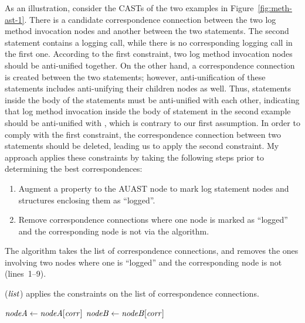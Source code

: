 As an illustration, consider the CASTs of the two examples in Figure~\ref{fig:meth-ast-1}. There is a candidate correspondence connection between the two log method invocation nodes and another between the two  statements. The second  statement contains a logging call, while there is no corresponding logging call in the first one. According to the first constraint, two log method invocation nodes should be anti-unified together. On the other hand, a correspondence connection is created between the two  statements; however, anti-unification of these statements includes anti-unifying their children nodes as well. Thus, statements inside the body of the  statements must be anti-unified with each other, indicating that log method invocation inside the body of  statement in the second example should be anti-unified with \nothing, which is contrary to our first assumption. In order to comply with the first constraint, the correspondence connection between two  statements should be deleted, leading us to apply the second constraint. My approach applies these constraints by taking the following steps prior to determining the best correspondences:
\begin{enumerate} [leftmargin=.4in]
\item	Augment a property to the AUAST node to mark log statement nodes and structures enclosing them as ``logged''.
\item	Remove correspondence connections where one node is marked as ``logged'' and the corresponding node is not via the  algorithm.
\end{enumerate}

The  algorithm takes the list of correspondence connections, and removes the ones involving two nodes where one is ``logged'' and the corresponding node is not (lines~1--9).

\begin{algorithm}
  \caption{($\mathit{list}$) applies the constraints on the list of correspondence connections.}
  \label{computeMatches}
  \begin{algorithmic}[1]
  \ApplyConstraints
      \State $\mathit{nodeA} \gets \mathit{nodeA}[\mathit{corr}]$
	  \State $\mathit{nodeB} \gets \mathit{nodeB}[\mathit{corr}]$
 	  \EndIf 		
 \EndFor 	
	
  \end{algorithmic}
\end{algorithm}





